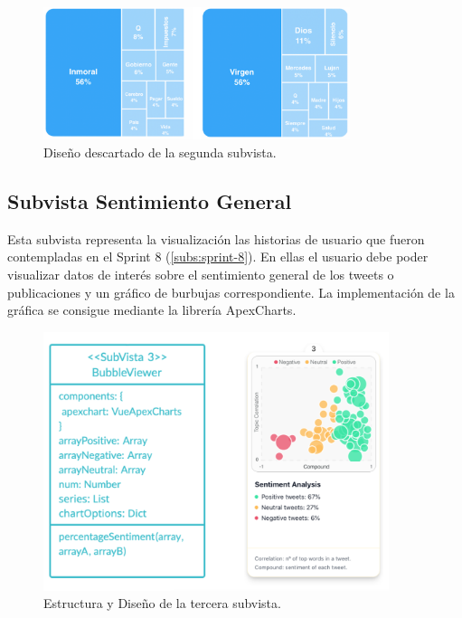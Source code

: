 \begin{figure}[H]
    \centering
    \myfloatalign
    \includegraphics[width=0.8\textwidth]{gfx/subvista2-descartada.png}
    \caption[Diseño descartado de la segunda subvista]{Diseño descartado de la segunda subvista.}\label{gfx:subvista2-descartada}
\end{figure}

\subsection{Subvista Sentimiento General}\label{subs:vista-senti}
Esta subvista representa la visualización las historias de usuario que fueron contempladas en el Sprint 8 (\ref{subs:sprint-8}). En ellas el usuario debe poder visualizar datos de interés sobre el sentimiento general de los tweets o publicaciones y un gráfico de burbujas correspondiente. La implementación de la gráfica se consigue mediante la librería ApexCharts.

\begin{figure}[H]
    \centering
    \myfloatalign
    \includegraphics[width=0.9\textwidth]{gfx/subvista4.png}
    \caption[Estructura y Diseño de la tercera subvista]{Estructura y Diseño de la tercera subvista.}\label{gfx:subvista4}
\end{figure}

